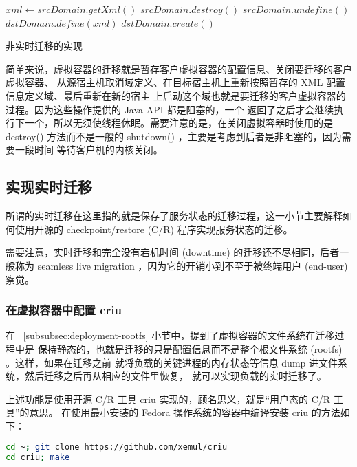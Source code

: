 \begin{algorithm}[H]
    \begin{algorithmic}
        \State $xml\gets srcDomain.getXml()$
            \State $srcDomain.destroy()$
        \EndIf
        \State $srcDomain.undefine()$
        \State $dstDomain.define(xml)$
        \State $dstDomain.create()$
    \EndIf
    \end{algorithmic}
    \caption{非实时迁移的实现}
\end{algorithm}

简单来说，虚拟容器的迁移就是暂存客户虚拟容器的配置信息、关闭要迁移的客户虚拟容器、
从源宿主机取消域定义、在目标宿主机上重新按照暂存的 XML 配置信息定义域、最后重新在新的宿主
上启动这个域也就是要迁移的客户虚拟容器的过程。因为这些操作提供的 Java API 都是阻塞的，一个
返回了之后才会继续执行下一个，所以无须使线程休眠。需要注意的是，在关闭虚拟容器时使用的是
destroy() 方法而不是一般的 shutdown() ，主要是考虑到后者是非阻塞的，因为需要一段时间
等待客户机的内核关闭。

\subsection{实现实时迁移}

所谓的实时迁移在这里指的就是保存了服务状态的迁移过程，这一小节主要解释如何使用开源的
checkpoint/restore (C/R) 程序实现服务状态的迁移。

需要注意，实时迁移和完全没有宕机时间 (downtime) 的迁移还不尽相同，后者一般称为
seamless live migration ，因为它的开销小到不至于被终端用户 (end-user) 察觉。

\subsubsection{在虚拟容器中配置 criu}

在 ~\ref{subsubsec:deployment-rootfs} 小节中，提到了虚拟容器的文件系统在迁移过程中是
保持静态的，也就是迁移的只是配置信息而不是整个根文件系统 (rootfs) 。这样，如果在迁移之前
就将负载的关键进程的内存状态等信息 dump 进文件系统，然后迁移之后再从相应的文件里恢复，
就可以实现负载的实时迁移了。

上述功能是使用开源 C/R 工具 criu 实现的，顾名思义，就是“用户态的 C/R 工具”的意思。
在使用最小安装的 Fedora 操作系统的容器中编译安装 criu 的方法如下：

\begin{lstlisting}[language=bash]
cd ~; git clone https://github.com/xemul/criu
cd criu; make
\end{lstlisting}

